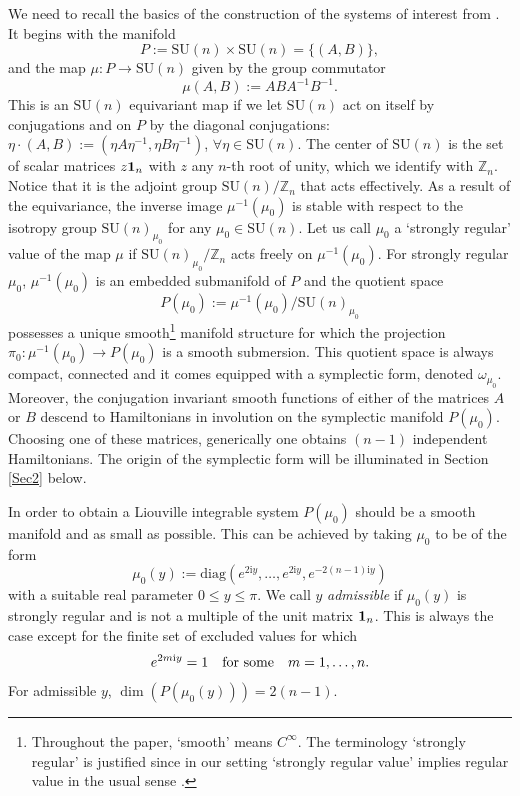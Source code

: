 \documentclass[a4paper,11pt,reqno]{amsart}
\theoremstyle{definition}
\numberwithin{equation}{section}
\newcommand{\be}{\begin{equation}}
\newcommand{\ee}{\end{equation}}
\def\ri{{\mathrm{i}}}                       %
\def\1{{\mbox{\boldmath $1$}}}              %
\def\bZ{{\mathbb Z}}                        %
\def\diag{\mathrm{diag}}                    %
\def\SU{\mathrm{SU}}                        %
\begin{document}
We need to recall the basics of the construction of the
systems of interest from \cite{FK}.
It begins with the manifold
\be
P:= \SU(n) \times \SU(n) = \{(A,B)\},
\label{I.1}\ee
and the map $\mu: P \to \SU(n)$ given by the group commutator
\be
\mu(A,B):= A B A^{-1} B^{-1}.
\label{I.2}\ee
This is an $\SU(n)$ equivariant map if we let $\SU(n)$ act on itself by conjugations and on $P$
by the diagonal conjugations: $\eta \cdot (A,B):= (\eta A\eta^{-1}, \eta B \eta^{-1})$, $\forall \eta\in \SU(n)$.
 The center of $\SU(n)$ is the set of scalar matrices $z \1_n$  with $z$ any $n$-th root of unity,
which we identify with $\bZ_n$.
Notice that it is the adjoint group $\SU(n)/\bZ_n$ that acts effectively.
As a result of the equivariance, the inverse image $\mu^{-1}(\mu_0)$ is stable with respect to the isotropy group
$\SU(n)_{\mu_0}$ for any  $\mu_0\in \SU(n)$.
Let us call $\mu_0$  a `strongly regular'  value of the map $\mu$ if $\SU(n)_{\mu_0}/\bZ_n$ acts freely on $\mu^{-1}(\mu_0)$.
For strongly regular $\mu_0$, $\mu^{-1}(\mu_0)$ is an embedded submanifold of $P$ and the quotient space
\be
P(\mu_0):= \mu^{-1}(\mu_0)/ \SU(n)_{\mu_0}
\label{I.3}\ee
possesses a unique smooth\footnote{Throughout  the paper, `smooth' means $C^\infty$.
 The terminology `strongly regular' is justified since in our setting `strongly regular value' implies regular value
 in the usual sense \cite{AMM}.}
 manifold structure for which the projection $\pi_0: \mu^{-1}(\mu_0) \to P(\mu_0)$ is a smooth submersion.
  This quotient space is always compact, connected and it comes equipped with a symplectic form,  denoted
 $\omega_{\mu_0}$.
 Moreover,  the conjugation invariant smooth functions of either of the matrices $A$ or $B$ descend
 to Hamiltonians in involution on the symplectic manifold $P(\mu_0)$.
 Choosing one of these matrices, generically one obtains  $(n-1)$ independent Hamiltonians.
 The origin of the symplectic form will be illuminated in Section \ref{Sec2} below.


In order to obtain a Liouville integrable system $P(\mu_0)$ should be a smooth
manifold and as small as possible. This can be achieved by taking $\mu_0$ to be of the form
\be
\mu_0(y):=\diag\left(e^{2\ri y}, \ldots, e^{2\ri y}, e^{-2(n-1) \ri y}\right)
\label{I.5}\ee
with  a suitable real parameter $0\leq y \leq\pi$.
 We call $y$ \emph{admissible} if $\mu_0(y)$ is strongly regular   and  is not
a multiple of the unit matrix $\1_n$.
This is always the case except for the finite set of excluded  values  \cite{FK} for which
\be
e^{2m \ri y} = 1\quad\hbox{for some} \quad
m=1,\dots, n.
\label{I.6}\ee
For admissible $y$, $\dim(P(\mu_0(y))) = 2(n-1)$.
\end{document}
